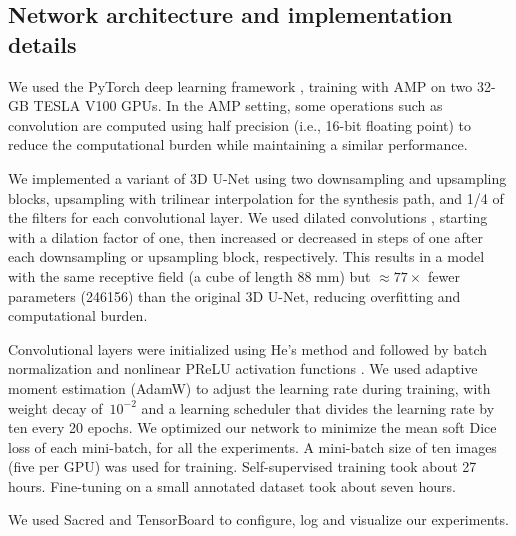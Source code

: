 \subsection{Network architecture and implementation details}

We used the PyTorch deep learning framework \cite{paszke_pytorch_2019}, training with \ac{AMP} on two 32-GB TESLA V100 \acp{GPU}.
In the \ac{AMP} setting, some operations such as convolution are computed using half precision (i.e., 16-bit floating point) to reduce the computational burden while maintaining a similar performance.

We implemented a variant of 3D U-Net \cite{cicek_3d_2016} using two downsampling and upsampling blocks, upsampling with trilinear interpolation for the synthesis path, and 1/4 of the filters for each convolutional layer.
We used dilated convolutions \cite{chen_deeplab_2018}, starting with a dilation factor of one, then increased or decreased in steps of one after each downsampling or upsampling block, respectively.
This results in a model with the same receptive field (a cube of length 88 mm) but $\approx 77 \times$ fewer parameters (\num{246156}) than the original 3D U-Net, reducing overfitting and computational burden.

Convolutional layers were initialized using He's method and followed by batch normalization and nonlinear \ac{PReLU} activation functions \cite{ioffe_batch_2015,he_delving_2015}.
We used adaptive moment estimation (AdamW) \cite{kingma_adam_2014,loshchilov_decoupled_2017} to adjust the learning rate during training, with weight decay of~$10^{-2}$ and a learning scheduler that divides the learning rate by ten every 20 epochs.
We optimized our network to minimize the mean soft Dice loss \cite{milletari_v-net_2016} of each mini-batch, for all the experiments.
A mini-batch size of ten images (five per \ac{GPU}) was used for training.
Self-supervised training took about 27 hours.
Fine-tuning on a small annotated dataset took about seven hours.

We used Sacred \cite{greff_sacred_2017} and TensorBoard \cite{abadi_tensorflow_2016} to configure, log and visualize our experiments.
